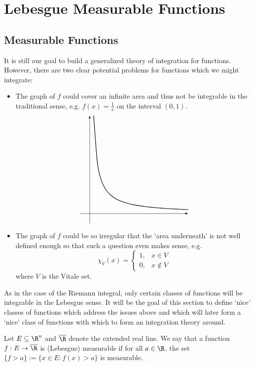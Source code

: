 \newpage
\section{Lebesgue Measurable Functions}
\subsection{Measurable Functions}

It is still our goal to build a generalized theory of integration for functions. However, there are two clear potential problems for functions which we might integrate:
	\begin{itemize}
	\item The graph of $f$ could cover an infinite area and thus not be integrable in the traditional sense, e.g. $f(x)=\frac{1}{x}$ on the interval $(0,1)$. 
		\[
            	\begin{tikzpicture}
		\draw[thick,domain= 0.2:5,smooth,variable=\x] plot ({\x},{1/\x}); 
            
                	\coordinate (XAxisMin) at (-0.5,0);
                	\coordinate (XAxisMax) at (5,0);
                	\coordinate (YAxisMin) at (0,-0.5);
                	\coordinate (YAxisMax) at (0,5);
                	\draw [thin,-latex] (XAxisMin) -- (XAxisMax);
                	\draw [thin,-latex] (YAxisMin) -- (YAxisMax);	
            	\end{tikzpicture}
		\]
	\item The graph of $f$ could be so irregular that the `area underneath' is not well defined enough so that such a question even makes sense, e.g.  
		\[
		\chi_V(x)=
		\begin{cases}
		1, & x \in V \\
		0, & x \notin V
		\end{cases}
		\]
	where $V$ is the Vitale set. 
	\end{itemize}
As in the case of the Riemann integral, only certain classes of functions will be integrable in the Lebesgue sense. It will be the goal of this section to define `nice' classes of functions which address the issues above and which will later form a `nice' class of functions with which to form an integration theory around. 


\begin{dfn}
Let $E \subseteq \R^n$ and $\overline{\R}$ denote the extended real line. We say that a function $f: E \to \overline{\R}$ is (Lebesgue) measurable if for all $a \in \R$, the set $\{f>a\}:=\{ x \in E \colon f(x)>a\}$ is measurable. 
\end{dfn}


